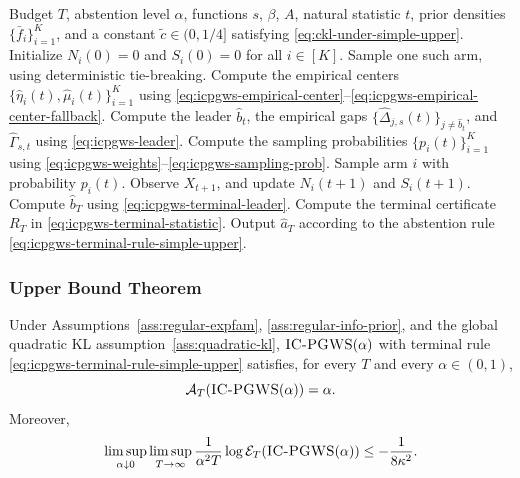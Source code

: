 \documentclass[10pt]{article}
\theoremstyle{plain}
\begin{document}
\begin{algorithm}[t]
\caption{Information-Coordinate Posterior Gap Weighted Sampling with Abstention
\textsc{IC-PGWS}$(\alpha)$}
\label{alg:icpgws-simple-upper}
\begin{algorithmic}[1]
\Require Budget \(T\), abstention level \(\alpha\), functions
\(s\), \(\beta\), \(A\), natural statistic \(t\), prior densities
\(\{\bar f_i\}_{i=1}^K\), and a constant
\(\widetilde c\in(0,1/4]\) satisfying \eqref{eq:ckl-under-simple-upper}.
\State Initialize \(N_i(0)=0\) and \(S_i(0)=0\) for all \(i\in[K]\).
        \State Sample one such arm, using deterministic tie-breaking.
    \Else
        \State Compute the empirical centers
        \(\{\widehat\eta_i(t),\widehat\mu_i(t)\}_{i=1}^K\) using
        \eqref{eq:icpgws-empirical-center}--\eqref{eq:icpgws-empirical-center-fallback}.
        \State Compute the leader \(\widehat b_t\), the empirical gaps
        \(\{\widehat\Delta_{j,s}(t)\}_{j\neq\widehat b_t}\), and
        \(\widehat\Gamma_{s,t}\) using \eqref{eq:icpgws-leader}.
        \State Compute the sampling probabilities
        \(\{p_i(t)\}_{i=1}^K\) using
        \eqref{eq:icpgws-weights}--\eqref{eq:icpgws-sampling-prob}.
        \State Sample arm \(i\) with probability \(p_i(t)\).
    \EndIf
    \State Observe \(X_{t+1}\), and update \(N_i(t+1)\) and \(S_i(t+1)\).
\EndFor
\State Compute \(\widehat b_T\) using \eqref{eq:icpgws-terminal-leader}.
\State Compute the terminal certificate \(R_T\) in
\eqref{eq:icpgws-terminal-statistic}.
\State Output \(\widehat a_T\) according to the abstention rule
\eqref{eq:icpgws-terminal-rule-simple-upper}.
\end{algorithmic}
\end{algorithm}






\subsubsection{Upper Bound Theorem}


\begin{theorem}
\label{thm:simple-transfer-upper}
Under Assumptions~\ref{ass:regular-expfam},
\ref{ass:regular-info-prior}, and the global quadratic KL assumption~\ref{ass:quadratic-kl}, $\textsc{IC-PGWS}(\alpha)$ with terminal rule
\eqref{eq:icpgws-terminal-rule-simple-upper} satisfies, for every \(T\) and every
\(\alpha\in(0,1)\),
\[
    \mathcal A_T(\textsc{IC-PGWS}(\alpha))=\alpha .
\]
Moreover,
\[
    \limsup_{\alpha\downarrow0}
    \limsup_{T\to\infty}
    \frac{1}{\alpha^2T}
    \log \mathcal E_T(\textsc{IC-PGWS}(\alpha))
    \le
    -\frac{1}{8\kappa^2}.
\]
\end{theorem}
\end{document}
